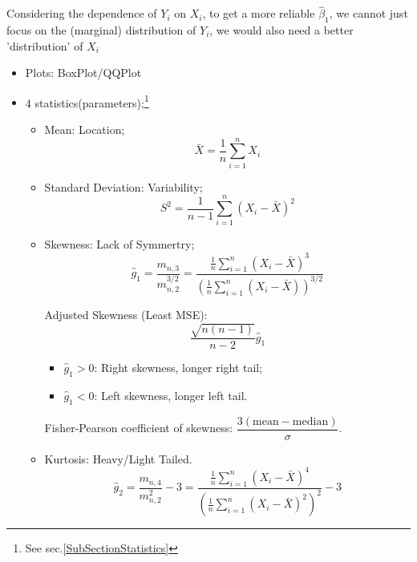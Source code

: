     Considering the dependence of $ Y_i $ on $ X_i $, to get a more reliable $ \hat{\beta }_1 $, we cannot just focus on the (marginal) distribution of $ Y_i $, we would also need a better 'distribution' of $ X_i $
    \begin{itemize}[topsep=2pt,itemsep=2pt]
        \item Plots: BoxPlot/QQPlot
        \item 4 statistics(parameters);\footnote{See sec.\ref{SubSectionStatistics}}
        \begin{itemize}[topsep=2pt,itemsep=2pt]
            \item Mean: Location;
            \begin{equation}
                \bar{X}=\dfrac{1}{n}\sum_{i=1}^nX_i 
            \end{equation}
            \item Standard Deviation: Variability;
            \begin{equation}
                S^2=\dfrac{1}{n-1}\sum_{i=1}^n(X_i-\bar{X}) ^2
            \end{equation}
            
            
            \item Skewness: Lack of Symmertry;
            \begin{equation}
                \hat{g}_1=\dfrac{m_{n,3}}{m_{n,2}^{3/2}}=\dfrac{\frac{1}{n}\sum\limits_{i=1}^n(X_i-\bar{X})^3}{\left( \frac{1}{n}\sum\limits_{i=1}^n(X_i-\bar{X}) \right)^{3/2}} 
            \end{equation}

            Adjusted Skewness (Least MSE):
            \begin{equation}
                \dfrac{\sqrt{n(n-1)}}{n-2}\hat{g}_1 
            \end{equation}
            
            \begin{itemize}[topsep=2pt,itemsep=2pt]
                \item $ \hat{g}_1>0 $: Right skewness, longer right tail;
                \item $ \hat{g}_1<0 $: Left skewness, longer left tail.
            \end{itemize}
            
                
            Fisher-Pearson coefficient of skewness: $ \dfrac{3(\mathrm{mean}-\mathrm{median})}{\sigma } $.


            \item Kurtosis: Heavy/Light Tailed.
            \begin{equation}
                \hat{g}_2=\dfrac{m_{n,4}}{m_{n,2}^2}-3= \dfrac{\frac{1}{n}\sum\limits_{i=1}^n(X_i-\bar{X})^4}{\left( \frac{1}{n}\sum\limits_{i=1}^n(X_i-\bar{X})^2 \right)^{2}} -3
            \end{equation}


\end{itemize}
\end{itemize}

